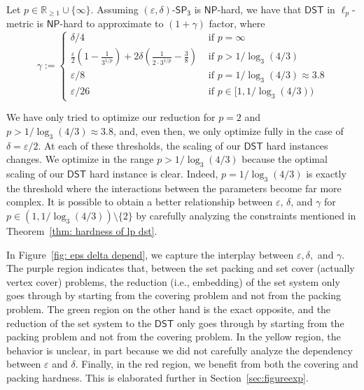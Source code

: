 \documentclass{theoretics}
\newcommand{\1}{\textbf{1}}
\newcommand{\setpT}{$\mathsf{SP_3}$\xspace}
\newcommand{\dst}{$\mathsf{DST}$\xspace}
\newcommand{\np}{$\mathsf{NP}$\xspace}
\begin{document}
\begin{theorem}\label{thm:intromain}
    Let $p\in \mathbb{R}_{\geq 1}\cup\{\infty\}$. Assuming $(\varepsilon,\delta)$-\setpT is \np-hard, we have that \dst in $\ell_p$-metric is \np-hard to approximate to $(1+\gamma)$ factor, where
    $$\gamma:=\begin{cases}
        \delta/4&\text{ if } p=\infty \\
        \frac{\varepsilon}{2}\left(1-\frac{1}{3^{1/p}}\right)+2\delta\left(\frac{1}{2\cdot 3^{1/p}}-\frac{3}{8}\right)&\text{ if }p>1/\log_3 (4/3) \\
        \varepsilon/8&\text{ if } p=1/\log_3 (4/3) \approx 3.8\\ 
 \varepsilon/26 &\text{ if } p  \in [1,  1/\log_3(4/3))
     \end{cases}$$
\end{theorem}

We have only tried to optimize our reduction for $p=2$ and $p>1/\log_3(4/3)\approx 3.8$, and, even then, we only optimize fully in the case of $\delta = \varepsilon/2$. At each of these thresholds, the scaling of our \dst hard instances changes. We optimize in the range $p>1/\log_3(4/3)$ because the optimal scaling of our \dst hard instance is clear. Indeed, $p = 1/\log_3(4/3)$ is exactly the threshold where the interactions between the parameters become far more complex. It is possible to obtain a better relationship between $\varepsilon$, $\delta$, and $\gamma$ for $p\in (1,1/\log_3(4/3))\setminus \{2\}$ by carefully analyzing the constraints mentioned in Theorem~\ref{thm: hardness of lp dst}. 

In Figure~\ref{fig: eps delta depend}, we capture the interplay between $\varepsilon,\delta,$ and $\gamma$. The purple region indicates that, between the set packing and set cover (actually vertex cover) problems, the reduction (i.e., embedding) of the set system only goes through by starting from the covering problem and not from the packing problem. The green region on the other hand is the exact opposite, and the reduction  of the set system to the \dst only goes through by starting from the packing problem and not from the covering problem. In the yellow region, the behavior is unclear, in part because we did not carefully analyze the dependency between $\varepsilon$ and $\delta$. Finally, in the red region, we benefit from both the covering and packing hardness. This is elaborated further in Section~\ref{sec:figureexp}. 
\end{document}
